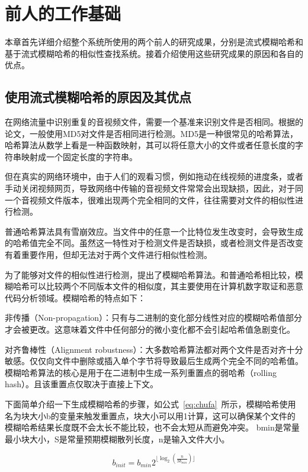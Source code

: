 \chapter{前人的工作基础}\label{chap:introduction}

本章首先详细介绍整个系统所使用的两个前人的研究成果，分别是流式模糊哈希和基于流式模糊哈希的相似性查找系统。接着介绍使用这些研究成果的原因和各自的优点。

\section{使用流式模糊哈希的原因及其优点}
在网络流量中识别重复的音视频文件，需要一个基准来识别文件是否相同。根据\cite{aoli2010}的论文，一般使用MD5对文件是否相同进行检测。MD5是一种很常见的哈希算法，哈希算法从数学上看是一种函数映射，其可以将任意大小的文件或者任意长度的字符串映射成一个固定长度的字符串。

但在真实的网络环境中，由于人们的观看习惯，例如拖动在线视频的进度条，或者手动关闭视频网页，导致网络中传输的音视频文件常常会出现缺损，因此，对于同一个音视频文件版本，很难出现两个完全相同的文件，往往需要对文件的相似性进行检测。

普通哈希算法具有雪崩效应。当文件中的任意一个比特位发生改变时，会导致生成的哈希值完全不同。虽然这一特性对于检测文件是否缺损，或者检测文件是否改变有着重要作用，但却无法对于两个文件进行相似性检测。

为了能够对文件的相似性进行检测，提出了模糊哈希算法。和普通哈希相比较，模糊哈希可以比较两个不同版本文件的相似度，其主要使用在计算机数字取证和恶意代码分析领域。模糊哈希的特点如下：

非传播（Non-propagation）：只有与二进制的变化部分线性对应的模糊哈希值部分才会被更改。这意味着文件中任何部分的微小变化都不会引起哈希值急剧变化。

对齐鲁棒性（Alignment robustness）：大多数哈希算法都对两个文件是否对齐十分敏感。仅仅向文件中删除或插入单个字节将导致最后生成两个完全不同的哈希值。模糊哈希算法的核心是用于在二进制中生成一系列重置点的弱哈希（rolling hash）。且该重置点仅取决于直接上下文。

下面简单介绍一下生成模糊哈希的步骤，如公式~\ref{eq:chufa}~所示，模糊哈希使用名为块大小b的变量来触发重置点，块大小可以用1计算，这可以确保某个文件的模糊哈希结果长度既不会太长不能比较，也不会太短从而避免冲突。 bmin是常量最小块大小，S是常量预期模糊散列长度，n是输入文件大小。

\begin{equation} \label{eq:chufa}
b_{init}=b_{min}2^{\lfloor \log_2(\frac{n}{Sb_{min}}) \rfloor}
\end{equation}

